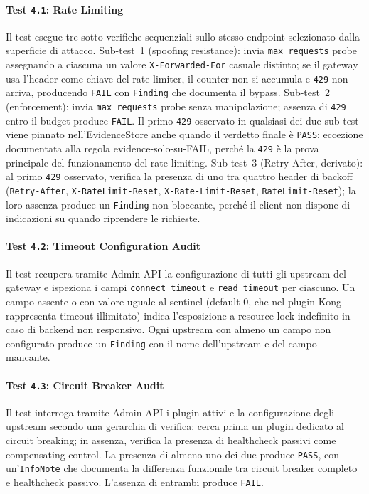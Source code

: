 \paragraph{Test \texttt{4.1}: Rate Limiting}
Il test esegue tre sotto-verifiche sequenziali sullo stesso endpoint selezionato dalla superficie di attacco. Sub-test~1 (spoofing resistance): invia \texttt{max\_requests} probe assegnando a ciascuna un valore \texttt{X-Forwarded-For} casuale distinto; se il gateway usa l'header come chiave del rate limiter, il counter non si accumula e \texttt{429} non arriva, producendo \texttt{FAIL} con \texttt{Finding} che documenta il bypass. Sub-test~2 (enforcement): invia \texttt{max\_requests} probe senza manipolazione; assenza di \texttt{429} entro il budget produce \texttt{FAIL}. Il primo \texttt{429} osservato in qualsiasi dei due sub-test viene pinnato nell'EvidenceStore anche quando il verdetto finale è \texttt{PASS}: eccezione documentata alla regola evidence-solo-su-FAIL, perché la \texttt{429} è la prova principale del funzionamento del rate limiting. Sub-test~3 (Retry-After, derivato): al primo \texttt{429} osservato, verifica la presenza di uno tra quattro header di backoff (\texttt{Retry-After}, \texttt{X-RateLimit-Reset}, \texttt{X-Rate-Limit-Reset}, \texttt{RateLimit-Reset}); la loro assenza produce un \texttt{Finding} non bloccante, perché il client non dispone di indicazioni su quando riprendere le richieste.

\paragraph{Test \texttt{4.2}: Timeout Configuration Audit}
Il test recupera tramite Admin \gls{API} la configurazione di tutti gli upstream del gateway e ispeziona i campi \texttt{connect\_timeout} e \texttt{read\_timeout} per ciascuno. Un campo assente o con valore uguale al sentinel (default 0, che nel plugin Kong rappresenta timeout illimitato) indica l'esposizione a resource lock indefinito in caso di backend non responsivo. Ogni upstream con almeno un campo non configurato produce un \texttt{Finding} con il nome dell'upstream e del campo mancante.

\paragraph{Test \texttt{4.3}: Circuit Breaker Audit}
Il test interroga tramite Admin \gls{API} i plugin attivi e la configurazione degli upstream secondo una gerarchia di verifica: cerca prima un plugin dedicato al circuit breaking; in assenza, verifica la presenza di healthcheck passivi come compensating control. La presenza di almeno uno dei due produce \texttt{PASS}, con un'\texttt{InfoNote} che documenta la differenza funzionale tra circuit breaker completo e healthcheck passivo. L'assenza di entrambi produce \texttt{FAIL}.


